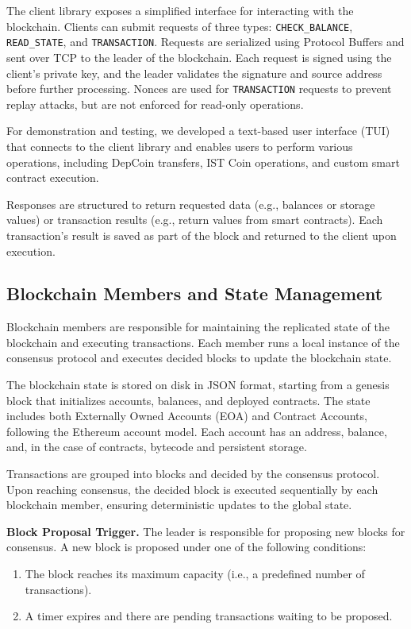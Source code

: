 \documentclass[runningheads]{llncs}
\begin{document}
The client library exposes a simplified interface for interacting with the blockchain. Clients can submit requests of three types: \texttt{CHECK\_BALANCE}, \texttt{READ\_STATE}, and \texttt{TRANSACTION}. Requests are serialized using Protocol Buffers and sent over TCP to the leader of the blockchain. Each request is signed using the client's private key, and the leader validates the signature and source address before further processing. Nonces are used for \texttt{TRANSACTION} requests to prevent replay attacks, but are not enforced for read-only operations.

For demonstration and testing, we developed a text-based user interface (TUI) that connects to the client library and enables users to perform various operations, including DepCoin transfers, IST Coin operations, and custom smart contract execution.

Responses are structured to return requested data (e.g., balances or storage values) or transaction results (e.g., return values from smart contracts). Each transaction’s result is saved as part of the block and returned to the client upon execution.

\subsection{Blockchain Members and State Management}

Blockchain members are responsible for maintaining the replicated state of the blockchain and executing transactions. Each member runs a local instance of the consensus protocol and executes decided blocks to update the blockchain state.

The blockchain state is stored on disk in JSON format, starting from a genesis block that initializes accounts, balances, and deployed contracts. The state includes both Externally Owned Accounts (EOA) and Contract Accounts, following the Ethereum account model. Each account has an address, balance, and, in the case of contracts, bytecode and persistent storage.

Transactions are grouped into blocks and decided by the consensus protocol. Upon reaching consensus, the decided block is executed sequentially by each blockchain member, ensuring deterministic updates to the global state.

\textbf{Block Proposal Trigger.} The leader is responsible for proposing new blocks for consensus. A new block is proposed under one of the following conditions:
\begin{enumerate}
    \item The block reaches its maximum capacity (i.e., a predefined number of transactions).
    \item A timer expires and there are pending transactions waiting to be proposed.
\end{enumerate}
\end{document}
